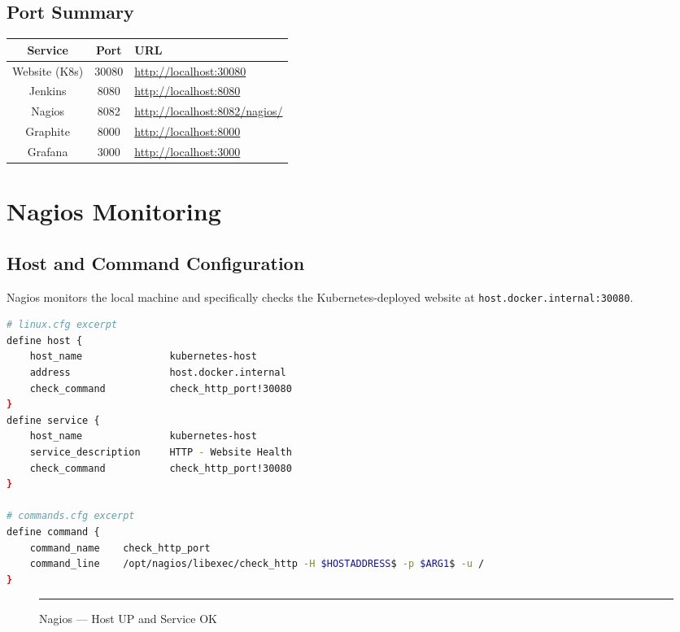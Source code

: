 \documentclass[12pt, a4paper]{article}
\begin{document}
\subsection{Port Summary}
\begin{table}[H]
\centering
\begin{tabular}{|c|c|l|}
\hline
\textbf{Service} & \textbf{Port} & \textbf{URL} \\ \hline
Website (K8s) & 30080 & \url{http://localhost:30080} \\ \hline
Jenkins & 8080 & \url{http://localhost:8080} \\ \hline
Nagios & 8082 & \url{http://localhost:8082/nagios/} \\ \hline
Graphite & 8000 & \url{http://localhost:8000} \\ \hline
Grafana & 3000 & \url{http://localhost:3000} \\ \hline
\end{tabular}
\end{table}

\newpage

\section{Nagios Monitoring}
\subsection{Host and Command Configuration}
Nagios monitors the local machine and specifically checks the Kubernetes-deployed website at \texttt{host.docker.internal:30080}.

\begin{lstlisting}[language=bash]
# linux.cfg excerpt
define host {
    host_name               kubernetes-host
    address                 host.docker.internal
    check_command           check_http_port!30080
}
define service {
    host_name               kubernetes-host
    service_description     HTTP - Website Health
    check_command           check_http_port!30080
}

# commands.cfg excerpt
define command {
    command_name    check_http_port
    command_line    /opt/nagios/libexec/check_http -H $HOSTADDRESS$ -p $ARG1$ -u /
}
\end{lstlisting}

\begin{figure}[H]
    \centering
    \rule{\textwidth}{6cm}
    \caption{Nagios --- Host UP and Service OK}
    \label{fig:nagios_status}
\end{figure}
\end{document}
